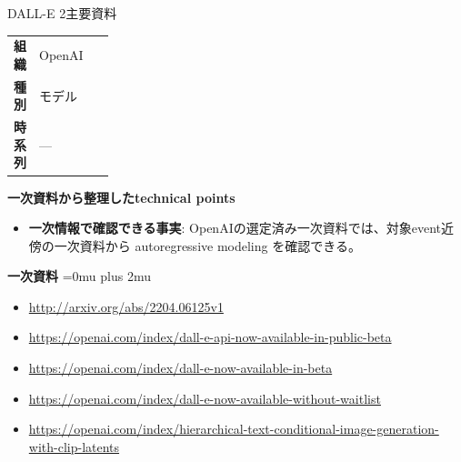 \begin{technicalnote}{DALL-E 2}{主要資料}
\begingroup
\begin{tabularx}{\linewidth}{@{}>{\bfseries}p{0.22\linewidth}X@{}}
組織 & OpenAI \\
種別 & モデル \\
時系列 & — \\
\end{tabularx}
\smallskip
{\bfseries 一次資料から整理したtechnical points}
\begin{itemize}[leftmargin=1.5em,itemsep=0.35em]
\item \textbf{一次情報で確認できる事実}: OpenAIの選定済み一次資料では、対象event近傍の一次資料から autoregressive modeling を確認できる。
\end{itemize}
\begin{minipage}{\linewidth}
\begin{samepage}
{\bfseries 一次資料}
\begingroup\sloppy
\Urlmuskip=0mu plus 2mu\relax
\begin{itemize}[leftmargin=1.5em,itemsep=0.25em]
\item {\scriptsize\url{http://arxiv.org/abs/2204.06125v1}}
\item {\scriptsize\url{https://openai.com/index/dall-e-api-now-available-in-public-beta}}
\item {\scriptsize\url{https://openai.com/index/dall-e-now-available-in-beta}}
\item {\scriptsize\url{https://openai.com/index/dall-e-now-available-without-waitlist}}
\item {\scriptsize\url{https://openai.com/index/hierarchical-text-conditional-image-generation-with-clip-latents}}
\end{itemize}
\endgroup
\end{samepage}
\end{minipage}
\endgroup
\end{technicalnote}
\medskip

